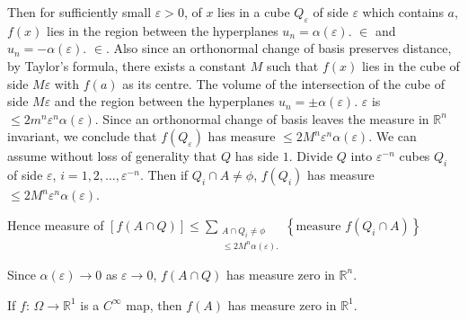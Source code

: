 Then for sufficiently small $\varepsilon > 0$, of $x$ lies in a cube
$Q_\varepsilon $ of side $\varepsilon $ which contains $a$, $f(x)$
lies in the region  between the hyperplanes $u_n = \alpha (\varepsilon)$. $\in
$ and $u_n = - \alpha (\varepsilon)$. $\in$. Also since an orthonormal
change of  basis preserves distance, by Taylor's formula, there exists
a constant $M$ such that $f(x)$ lies in the cube of side $M \varepsilon$ with
$f(a)$ as its centre. The volume of the intersection of the cube of
side $M \varepsilon$ and the region between the hyperplanes $u_n = \pm \alpha
(\varepsilon)$. $\varepsilon$ is $\leq 2 m^n \varepsilon^n \alpha (\varepsilon)$. Since an
orthonormal change of basis leaves the measure in $\mathbb{R}^n$
invariant, we conclude that $f(Q_\varepsilon)$ has measure $\leq 2M^n \varepsilon ^n
\alpha (\varepsilon)$. We can assume without loss of generality that
$Q$ has side $1$. Divide $Q$ into $\varepsilon^{-n}$ cubes $Q_i$ of side
$\varepsilon$, $i = 1, 2, \ldots, \varepsilon^{-n}$. Then if $Q_i \cap A \neq \phi$,
$f(Q_i)$ has measure $\leq 2 M^n \varepsilon ^n \alpha (\varepsilon)$.

Hence measure of $[f (A \cap Q) ] \leq \sum\limits_{\substack{A\cap
Q_i \neq \phi \\ \leq 2 M^n \alpha (\varepsilon).}} \left\{ \text{
  measure } f(Q_i \cap A) \right\}$

Since $\alpha (\varepsilon) \to 0$ as $\varepsilon \to 0$, $f (A \cap Q)$ has measure
zero in $\mathbb{R}^n$.  

\begin{proposition}\label{chap1:sec4:prop2}%
If $f$: $\Omega \to \mathbb{R}^1$ is a $C^\infty$ map, then $f(A)$
has measure zero in $\mathbb{R}^1$.  
\end{proposition}


